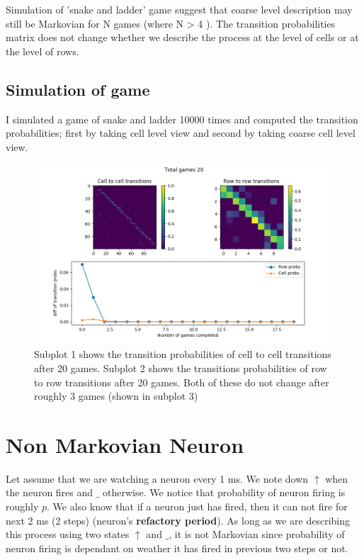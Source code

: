 \documentclass[a4paper,10pt]{article}
\begin{document}
Simulation of 'snake and ladder' game suggest that coarse level description may
still be Markovian for N games (where N > 4 ). The transition probabilities
matrix does not change whether we describe the process at the level of cells or
at the level of rows.

\subsection{Simulation of game}

I simulated a game of snake and ladder 10000 times and
computed the transition probabilities; first by taking cell level view and
second by taking coarse cell level view.

\begin{figure}[ht!]
\begin{center}
    \includegraphics[width=1\textwidth]{./snake_and_ladder.py.png}
\end{center}
\caption{Subplot 1 shows the transition probabilities of cell to cell
    transitions after 20 games. Subplot 2 shows the transitions probabilities of
    row to row transitions after 20 games. Both of these do not change after
roughly 3 games (shown in subplot 3) }
\label{fig:}
\end{figure}

\section{Non Markovian Neuron}

Let assume that we are watching a neuron every 1 ms. We note down $\uparrow$
when the neuron fires and $\_$ otherwise. We notice that probability of neuron
firing is roughly $p$. We also know that if a neuron just has fired, then it can
not fire for next 2 ms (2 steps) (neuron's \textbf{refactory period}).  As long
as we are describing this process using two states $\uparrow$ and $\_$, it is
not Markovian since probability of neuron firing is dependant on weather it has
fired in previous two steps or not.
\end{document}
